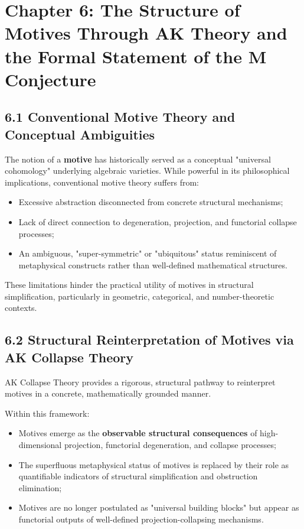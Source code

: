 \documentclass[11pt]{article}
\begin{document}
\FloatBarrier




\section{Chapter 6: The Structure of Motives Through AK Theory and the Formal Statement of the M Conjecture}

\subsection{6.1 Conventional Motive Theory and Conceptual Ambiguities}

The notion of a \textbf{motive} has historically served as a conceptual "universal cohomology" underlying algebraic varieties. While powerful in its philosophical implications, conventional motive theory suffers from:

\begin{itemize}
    \item Excessive abstraction disconnected from concrete structural mechanisms;
    \item Lack of direct connection to degeneration, projection, and functorial collapse processes;
    \item An ambiguous, "super-symmetric" or "ubiquitous" status reminiscent of metaphysical constructs rather than well-defined mathematical structures.
\end{itemize}

These limitations hinder the practical utility of motives in structural simplification, particularly in geometric, categorical, and number-theoretic contexts.

\subsection{6.2 Structural Reinterpretation of Motives via AK Collapse Theory}

AK Collapse Theory provides a rigorous, structural pathway to reinterpret motives in a concrete, mathematically grounded manner.

Within this framework:

\begin{itemize}
    \item Motives emerge as the \textbf{observable structural consequences} of high-dimensional projection, functorial degeneration, and collapse processes;
    \item The superfluous metaphysical status of motives is replaced by their role as quantifiable indicators of structural simplification and obstruction elimination;
    \item Motives are no longer postulated as "universal building blocks" but appear as functorial outputs of well-defined projection-collapsing mechanisms.
\end{itemize}
\end{document}
